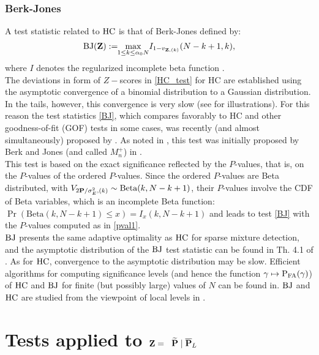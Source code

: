 \documentclass[journal]{IEEEtran}
\begin{document}
 \subsubsection{Berk-Jones }
 \label{bj}
A  test statistic related to $\rm HC$ is that of Berk-Jones \cite{Moscovich_2016,Aldor_2013,Mary_2014,Kaplan_2014,Gontscharuk_2014} defined by:
{
 \begin{equation}  
	{ \rm BJ({\bf{Z}})}:= \!\!\displaystyle{\max_{1 \le k \le \alpha_0 N}} I_{1-v_{{\bf Z},(k)}} (N-k+1,k), 
	\label{BJ}
\end{equation}	
}
where $I$ denotes the regularized incomplete beta function  \cite{Abramowitz_1972}.\\
The deviations in form of $Z-$scores in \eqref{HC_test} for HC are established using  the asymptotic convergence of a binomial distribution to a Gaussian distribution. In the tails, however, this convergence is very slow (see{\cite{Mary_2014, Li_2015,Moscovich_2016}} for illustrations). For this reason the test statistics \eqref{BJ}, which compares favorably to HC and other goodness-of-fit (GOF) tests in some cases, was recently   (and almost simultaneously) proposed by{ \cite{Moscovich_2016,Aldor_2013,Kaplan_2014,Gontscharuk_2014}}. As noted in{ \cite{Moscovich_2016, Gontscharuk_2016}},  this test was initially proposed by Berk and Jones (and called $M_n^+$) in \cite{Berk_1979}.\\
This test is based on the exact significance reflected by the $P$-values, that is, on the $P$-values of the ordered $P$-values. Since the ordered $P$-values are Beta distributed, with  { $V_{{  {2{ \bf{P}}}/{\sigma_E^2} },(k)}\sim \text{Beta}(k,N-k+1)$, their $P$-values involve the CDF of Beta variables, which is an incomplete Beta function: $\Pr(\text{Beta}(k,N-k+1)\leq x)=I_x(k,N-k+1)$ } and leads to test \eqref{BJ} with the $P$-values computed as in \eqref{pval1}.\\
 $\rm BJ$ presents the same adaptive optimality as $\rm HC$ for sparse mixture detection, and the asymptotic distribution of the $\rm BJ$ test statistic  can be found in Th. 4.1 of  \cite{Moscovich_2016}.  As for $\rm HC$, convergence to the asymptotic distribution may be slow. { Efficient algorithms for computing significance levels  (and hence the function $\gamma \mapsto {\rm P_{FA}}(\gamma)$)  of $\rm HC$ and $\rm BJ$ for finite (but possibly large) values of $N$ can be found in\cite{Moscovich_2016,Moscovich_2015b}. $\rm BJ$ and $\rm HC$  are studied from the viewpoint of  local levels in {\cite{Gontscharuk_2016}}.}
\section{ Tests { applied to $\bf{Z}=$}  $\widetilde{\bf P}\; |\; \overline{\bf P}_L$}
 \label{sec5}
 
\end{document}
